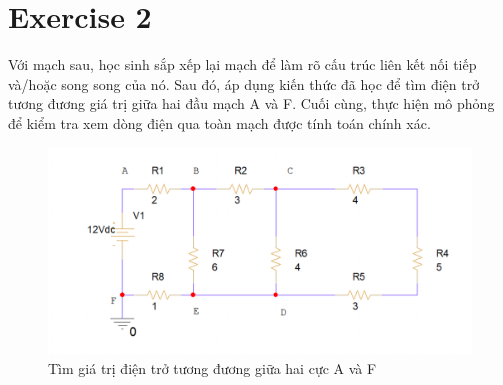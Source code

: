 \section{Exercise 2}
Với mạch sau, học sinh sắp xếp lại mạch để làm rõ cấu trúc liên kết nối tiếp và/hoặc song song của nó. Sau đó, áp dụng kiến thức đã học để tìm điện trở tương đương
giá trị giữa hai đầu mạch A và F. Cuối cùng, thực hiện mô phỏng để kiểm tra xem
dòng điện qua toàn mạch được tính toán chính xác.\\
\begin{figure}[!htbp]
\centering
\includegraphics[width=1\textwidth]{graphics/ex2/f1.png}
\caption{Tìm giá trị điện trở tương đương giữa hai cực A và F}
\end{figure}
